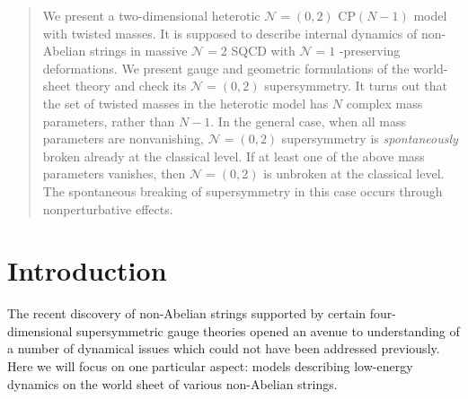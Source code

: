 \documentclass[12pt]{article}
\newcommand{\ntwo}{${\mathcal N}=2$ }
\newcommand{\ntwot}{${\mathcal N}= \left(2,2\right) $ }
\newcommand{\ntwoo}{${\mathcal N}= \left(0,2\right) $ }
\newcommand{\none}{${\mathcal N}=1$ }
\begin{document}
\begin{titlepage}
\begin{abstract}
We present a two-dimensional heterotic \ntwoo CP$(N-1)$ model
with twisted masses. It is supposed to describe internal dynamics of non-Abelian strings 
in massive \ntwo SQCD with
\none-preserving deformations. We present gauge and geometric
formulations of the world-sheet theory and check its \ntwoo
supersymmetry. 
It turns out that the set of twisted masses
 in the heterotic model  has $N$ complex mass parameters, rather than $N-1$.
 In the general case, when all mass parameters are nonvanishing, \ntwoo
 supersymmetry is {\em spontaneously} broken already at the classical level.
 If at least one of the above mass parameters vanishes, then \ntwoo is unbroken at the classical level.
 The spontaneous breaking of supersymmetry in this case occurs through nonperturbative effects.



 

\end{abstract}

\end{titlepage}

\section{Introduction}

The recent discovery of non-Abelian strings 
\cite{HT1,ABEKY,SYmon,HT2}
supported by certain four-dimensional supersymmetric gauge theories 
opened an avenue to understanding of a number of dynamical issues which could not have been addressed
previously. Here we will focus on one particular aspect: models describing low-energy dynamics
on the world sheet of various non-Abelian strings.
\end{document}
